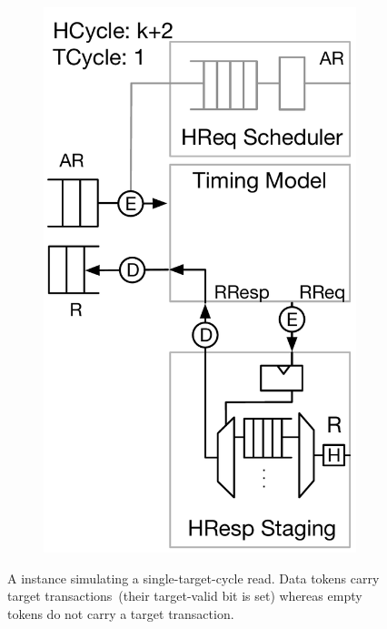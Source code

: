 \begin{figure}
\begin{subfigure}[t]{0.23\textwidth}
        \includegraphics[width=\columnwidth]{figures/model-operation-4.pdf}
        \caption{}
        \label{fig:model-operation-4}
    \end{subfigure}
	\centering
    \caption{A \PNAME instance simulating a single-target-cycle read. Data
    tokens carry target transactions~(their target-valid bit is set) whereas
    empty tokens do not carry a target transaction.}
    \label{fig:model-operation}
\end{figure}


